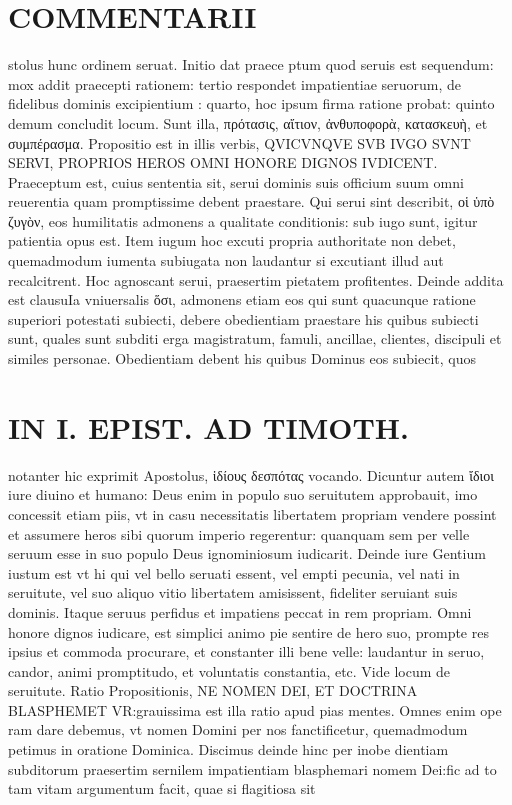 \documentclass{article}
\begin{document}
\begin{pages}
\section*{COMMENTARII }
\marginpar{[ p.144 ]}\pstart stolus hunc ordinem seruat. Initio dat praece ptum quod seruis est sequendum: mox addit praecepti rationem: tertio respondet impatientiae seruorum, de fidelibus dominis excipientium : quarto, hoc ipsum firma ratione probat: quinto demum concludit locum. Sunt illa, πρότασις, αἴτιον, ἀνθυποφορὰ, κατασκευὴ, et συμπέρασμα.  \pend\pstart Propositio est in illis verbis, QVICVNQVE SVB IVGO SVNT SERVI, PROPRIOS HEROS OMNI HONORE DIGNOS IVDICENT. Praeceptum est, cuius sententia sit, serui dominis suis officium suum omni reuerentia quam promptissime debent praestare.  \pend\pstart Qui serui sint describit, οἱ ὑπὸ ζυγὸν, eos humilitatis admonens a qualitate conditionis: sub iugo sunt, igitur patientia opus est. Item iugum hoc excuti propria authoritate non debet, quemadmodum iumenta subiugata non laudantur si excutiant illud aut recalcitrent. Hoc agnoscant serui, praesertim pietatem profitentes. Deinde addita est clausuIa vniuersalis ὅσι, admonens etiam eos qui sunt quacunque ratione superiori potestati subiecti, debere obedientiam praestare his quibus subiecti sunt, quales sunt subditi erga magistratum, famuli, ancillae, clientes, discipuli et similes personae. Obedientiam debent his quibus Dominus eos subiecit, quos  \pend
\section*{IN I. EPIST. AD TIMOTH. }
\marginpar{[ p.145 ]}\pstart notanter hic exprimit Apostolus, ἱδίους δεσπότας vocando. Dicuntur autem ἴδιοι iure diuino et humano: Deus enim in populo suo seruitutem approbauit, imo concessit etiam piis, vt in casu necessitatis libertatem propriam vendere possint et assumere heros sibi quorum imperio regerentur: quanquam sem per velle seruum esse in suo populo Deus ignominiosum iudicarit. Deinde iure Gentium iustum est vt hi qui vel bello seruati essent, vel empti pecunia, vel nati in seruitute, vel suo aliquo vitio libertatem amisissent, fideliter seruiant suis dominis. Itaque seruus perfidus et impatiens peccat in rem propriam. Omni honore dignos iudicare, est simplici animo pie sentire de hero suo, prompte res ipsius et commoda procurare, et constanter illi bene velle: laudantur in seruo, candor, animi promptitudo, et voluntatis constantia, etc. Vide locum de seruitute.  \pend\pstart Ratio Propositionis, NE NOMEN DEI, ET DOCTRINA BLASPHEMET VR:grauissima est illa ratio apud pias mentes. Omnes enim ope ram dare debemus, vt nomen Domini per nos fanctificetur, quemadmodum petimus in oratione Dominica. Discimus deinde hinc per inobe dientiam subditorum praesertim sernilem impatientiam blasphemari nomem Dei:fic ad to tam vitam argumentum facit, quae si flagitiosa sit  \pend

\end{pages}
\end{document}
